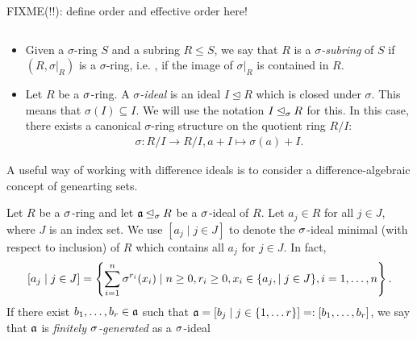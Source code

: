 FIXME(!!): define order and effective order here!

\begin{defn} $\phantom{}$
\begin{itemize}
\item Given a $\sigma$-ring $S$ and a subring $R \leq S$, we say that $R$ is a $\sigma$\emph{-subring}  of $S$ if $(R,\sigma|_{R})$ is a $\sigma$-ring,
i.e. , if the image of $\sigma|_{R}$ is contained in $R$.
\item Let $R$ be a $\sigma$-ring. A $\sigma$\emph{-ideal}  is an ideal $I \unlhd R$ which is closed under $\sigma$. This means that $\sigma(I) \subseteq I$. We will use the notation $I \unlhd_{\sigma} R$ for this. In this case, there exists a canonical $\sigma$-ring structure on the quotient ring $R/I$:
\begin{align*} \sigma: R/I \rightarrow R/I, a + I \mapsto \sigma(a) + I. \end{align*}
\end{itemize}
\end{defn}

A useful way of working with difference ideals is to consider a difference-algebraic concept of genearting sets.

\begin{defn}
Let $R$ be a $\sigma$-ring and let  $\mathfrak{a} \unlhd_{\sigma} R$ be a $\sigma$-ideal of $R$. Let $a_j \in R$ for all $ j \in J$, where $J$ is an index set. We use $[a_j \mid j \in J]$ to denote the $\sigma$-ideal minimal (with respect to inclusion) of $R$ which contains all $a_j$ for $j \in J$. In fact,  \[[a_j \mid j \in J] = \left\{ \sum_{i=1}^n \sigma^{r_i}(x_i) \mid n \geq 0, r_i \geq 0, x_i \in \{a_j, \mid j \in J \}, i=1,\ldots,n \right\}. \] 
If there exist $b_1,\ldots,b_r \in \mathfrak{a}$ such that $\mathfrak{a} = [b_j \mid j \in \{1,\ldots r \}] =: [b_1,\ldots,b_r]$,
 we say that $\mathfrak{a}$ is \emph{finitely $\sigma$-generated} as a $\sigma$-ideal 
\end{defn}

